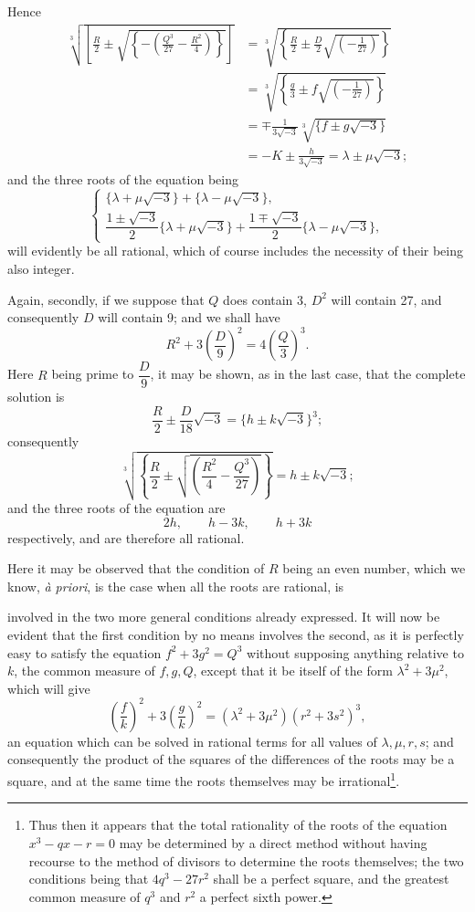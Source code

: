 \documentclass[11pt]{article}
\newcommand{\sourcepage}[1]{\marginpar{\scriptsize p.~#1}}
\begin{document}
Hence
\[
\begin{aligned}
\sqrt[3]{\left[\frac{R}{2}\pm\sqrt{\left\{-\left(\frac{Q^3}{27}-\frac{R^2}{4}\right)\right\}}\right]}
&=\sqrt[3]{\left\{\frac{R}{2}\pm\frac{D}{2}\sqrt{\left(-\frac{1}{27}\right)}\right\}}\\
&=\sqrt[3]{\left\{\frac{g}{3}\pm f\sqrt{\left(-\frac{1}{27}\right)}\right\}}\\
&=\mp\frac{1}{3\sqrt{-3}}\sqrt[3]{\{f\pm g\sqrt{-3}\}}\\
&=-K\pm\frac{h}{3\sqrt{-3}}=\lambda\pm\mu\sqrt{-3};
\end{aligned}
\]
and the three roots of the equation being
\[
\left\{\begin{array}{l}
\{\lambda+\mu\sqrt{-3}\}+\{\lambda-\mu\sqrt{-3}\},\\[0.4em]
\dfrac{1\pm\sqrt{-3}}{2}\{\lambda+\mu\sqrt{-3}\}+\dfrac{1\mp\sqrt{-3}}{2}\{\lambda-\mu\sqrt{-3}\},
\end{array}\right.
\]
will evidently be all rational, which of course includes the necessity of their being also integer.

Again, secondly, if we suppose that $Q$ does contain 3, $D^2$ will contain 27, and consequently $D$ will contain 9; and we shall have
\[
R^2+3\left(\frac{D}{9}\right)^2=4\left(\frac{Q}{3}\right)^3.
\]
Here $R$ being prime to $\dfrac{D}{9}$, it may be shown, as in the last case, that the complete solution is
\[
\frac{R}{2}\pm\frac{D}{18}\sqrt{-3}=\{h\pm k\sqrt{-3}\}^3;
\]
consequently
\[
\sqrt[3]{\left\{\frac{R}{2}\pm\sqrt{\left(\frac{R^2}{4}-\frac{Q^3}{27}\right)}\right\}}=h\pm k\sqrt{-3};
\]
and the three roots of the equation are
\[
2h,\qquad h-3k,\qquad h+3k
\]
respectively, and are therefore all rational.

Here it may be observed that the condition of $R$ being an even number, which we know, \emph{\`a priori}, is the case when all the roots are rational, is

\sourcepage{106}
involved in the two more general conditions already expressed. It will now be evident that the first condition by no means involves the second, as it is perfectly easy to satisfy the equation $f^2+3g^2=Q^3$ without supposing anything relative to $k$, the common measure of $f,g,Q$, except that it be itself of the form $\lambda^2+3\mu^2$, which will give
\[
\left(\frac{f}{k}\right)^2+3\left(\frac{g}{k}\right)^2=(\lambda^2+3\mu^2)(r^2+3s^2)^3,
\]
an equation which can be solved in rational terms for all values of $\lambda,\mu,r,s$; and consequently the product of the squares of the differences of the roots may be a square, and at the same time the roots themselves may be irrational\footnote{Thus then it appears that the total rationality of the roots of the equation $x^3-qx-r=0$ may be determined by a direct method without having recourse to the method of divisors to determine the roots themselves; the two conditions being that $4q^3-27r^2$ shall be a perfect square, and the greatest common measure of $q^3$ and $r^2$ a perfect sixth power.}.
\end{document}
